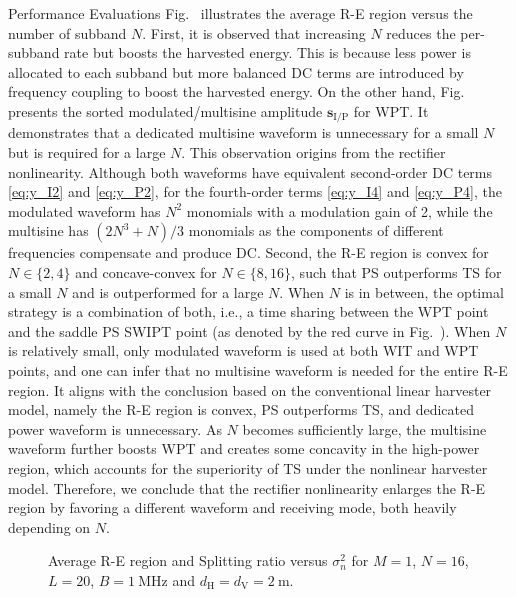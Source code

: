 \documentclass[journal]{IEEEtran}
\begin{document}
\begin{section}{Performance Evaluations}
		Fig.~ illustrates the average R-E region versus the number of subband $N$. First, it is observed that increasing $N$ reduces the per-subband rate but boosts the harvested energy. This is because less power is allocated to each subband but more balanced DC terms are introduced by frequency coupling to boost the harvested energy. On the other hand, Fig.~ presents the sorted modulated/multisine amplitude $\boldsymbol{s}_{\mathrm{I/P}}$ for WPT. It demonstrates that a dedicated multisine waveform is unnecessary for a small $N$ but is required for a large $N$. This observation origins from the rectifier nonlinearity. Although both waveforms have equivalent second-order DC terms \eqref{eq:y_I2} and \eqref{eq:y_P2}, for the fourth-order terms \eqref{eq:y_I4} and \eqref{eq:y_P4}, the modulated waveform has $N^2$ monomials with a modulation gain of \num{2}, while the multisine has $(2N^3+N)/3$ monomials as the components of different frequencies compensate and produce DC. Second, the R-E region is convex for $N \in \{2,4\}$ and concave-convex for $N \in \{8,16\}$, such that PS outperforms TS for a small $N$ and is outperformed for a large $N$. When $N$ is in between, the optimal strategy is a combination of both, i.e., a time sharing between the WPT point and the saddle PS SWIPT point (as denoted by the red curve in Fig.~). When $N$ is relatively small, only modulated waveform is used at both WIT and WPT points, and one can infer that no multisine waveform is needed for the entire R-E region. It aligns with the conclusion based on the conventional linear harvester model, namely the R-E region is convex, PS outperforms TS, and dedicated power waveform is unnecessary. As $N$ becomes sufficiently large, the multisine waveform further boosts WPT and creates some concavity in the high-power region, which accounts for the superiority of TS under the nonlinear harvester model. Therefore, we conclude that the rectifier nonlinearity enlarges the R-E region by favoring a different waveform and receiving mode, both heavily depending on $N$.

		\begin{figure}[!t]
			\centering
			\caption{Average R-E region and Splitting ratio versus $\sigma_n^2$ for $M=1$, $N=16$, $L=20$, $B=\SI{1}{\MHz}$ and $d_{\mathrm{H}}=d_{\mathrm{V}}=\SI{2}{\meter}$.}
		\end{figure}


\end{section}
\end{document}
